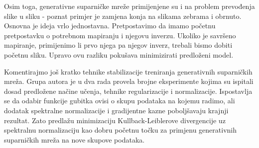 Osim toga, generativne suparničke mreže primijenjene su i na problem prevođenja slike u sliku - poznat primjer je zamjena konja na slikama zebrama i obrnuto. Osnovna je ideja vrlo jednostavna. Pretpostavimo da imamo početnu pretpostavku o potrebnom mapiranju i njegovu inverzu. Ukoliko je savršeno mapiranje, primijenimo li prvo njega pa njegov inverz, trebali bismo dobiti početnu sliku. Upravo ovu razliku pokušava minimizirati predloženi model.


Komentirajmo još kratko tehnike stabilizacije treniranja generativnih suparničkih mreža. Grupa autora je u dva rada  provela brojne eksperimente kojima su ispitali dosad predložene načine učenja, tehnike regularizacije i normalizacije. Ispostavlja se da odabir funkcije gubitka ovisi o skupu podataka na kojemu radimo, ali dodatak spektralne normalizacije i gradijentne kazne poboljšavaju krajnji rezultat. Zato predlažu minimizaciju Kullback-Leiblerove divergencije uz spektralnu normalizaciju kao dobru početnu točku za primjenu generativnih suparničkih mreža na nove skupove podataka. 